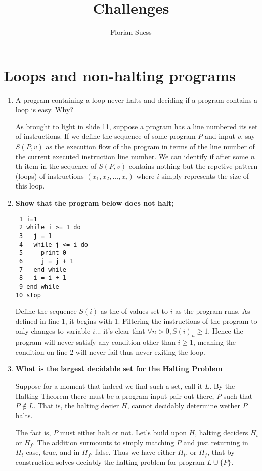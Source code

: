 \documentclass{article}
\title {Challenges}
\author {Florian Suess}
\newenvironment{answered}{\par\normalfont}{}
\begin{document}
\maketitle
\section{Loops and non-halting programs}

\begin{enumerate}
	\item A program containing a loop never halts and deciding if a program contains a loop is easy. Why?
	\begin{answered}
		As brought to light in slide 11, suppose a program has a line numbered its set of instructions. If we define the sequence of some program $P$ and input $v$, say $S(P, v)$ as the execution flow of the program in terms of the line number of the current executed instruction line number. We can identify if after some $n$th item in the sequence of $S(P,v)$ contains nothing but the repetive pattern (loops) of instructions $(x_1, x_2, ..., x_i)$ where $i$ simply represents the size of this loop.
	\end{answered}
\item \textbf{Show that the program below does not halt;}
\begin{verbatim}
 1 i=1
 2 while i >= 1 do 
 3   j = 1
 4   while j <= i do
 5     print 0
 6     j = j + 1
 7   end while	
 8   i = i + 1
 9 end while
10 stop
\end{verbatim}
 \begin{answered}
	 Define the sequence $S(i)$ as the of values set to $i$ as the program runs. As defined in line 1, it begins with 1. Filtering the instructions of the program to only changes to variable $i$... it's clear that $\forall n > 0, S(i)_n \geq 1$. Hence the program will never satisfy any condition other than $i \geq 1$, meaning the condition on line 2 will never fail thus never exiting the loop.
 \end{answered}

\pagebreak
\item \textbf{What is the largest decidable set for the Halting Problem}
	\begin{answered}
	Suppose for a moment that indeed we find such a set, call it $L$. By the Halting Theorem there must be a program input pair out there, $P$ such that $P \not\in L$. That is, the halting decier $H$, cannot decidably determine wether $P$ halts.

	The fact is, $P$ must either halt or not. Let's build upon $H$, halting deciders $H_t$ or $H_f$. The addition surmounts to simply matching $P$ and just returning in $H_t$ case, true, and in $H_f$, false. Thus we have either $H_t$, or $H_f$, that by construction solves deciably the halting problem for program $L \cup \{P\}$.
	\end{answered}


\end{enumerate}
\end{document}
